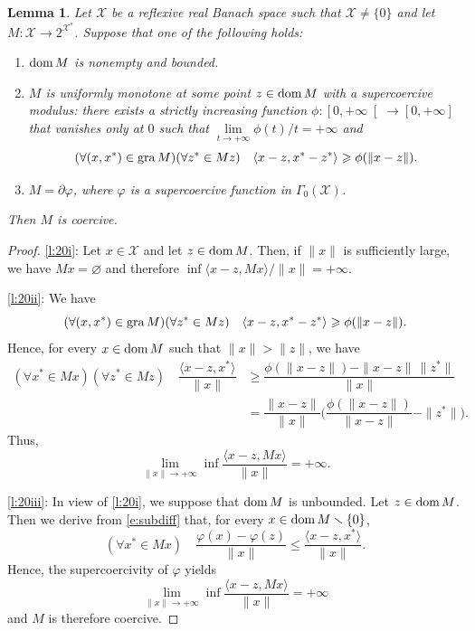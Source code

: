 \documentclass[a4paper,11pt,fleqn]{article}
\renewcommand{\leq}{\ensuremath{\leqslant}}
\renewcommand{\geq}{\ensuremath{\geqslant}}
\newcommand{\pair}[2]{\langle{{#1},{#2}}\rangle}
\newcommand{\XX}{\ensuremath{{\mathcal X}}}
\newcommand{\emp}{\ensuremath{{\varnothing}}}
\newcommand{\pinf}{\ensuremath{{+\infty}}}
\newcommand{\dom}{\ensuremath{\text{\rm dom}\,}}
\newcommand{\gra}{\ensuremath{\text{\rm gra}\,}}
\newtheorem{lemma}[theorem]{Lemma}
\theoremstyle{plain}{\theorembodyfont{\rmfamily}%
\newtheorem{conjecture}[theorem]{Conjecture}}
\theoremstyle{plain}{\theorembodyfont{\rmfamily}%
\newtheorem{example}[theorem]{Example}}
\theoremstyle{plain}{\theorembodyfont{\rmfamily}%
\newtheorem{remark}[theorem]{Remark}}
\theoremstyle{plain}{\theorembodyfont{\rmfamily}%
\newtheorem{algorithm}[theorem]{Algorithm}}
\theoremstyle{plain}{\theorembodyfont{\rmfamily}%
\newtheorem{condition}[theorem]{Condition}}
\theoremstyle{plain}{\theorembodyfont{\rmfamily}%
\newtheorem{definition}[theorem]{Definition}}
\theoremstyle{plain}{\theorembodyfont{\rmfamily}
\newtheorem{problem}[theorem]{Problem}}
\theoremstyle{plain}{\theorembodyfont{\rmfamily}
\newtheorem{notation}[theorem]{Notation}}
\numberwithin{equation}{section}
\begin{document}
\begin{lemma}
\label{l:20}
Let $\XX$ be a reflexive real Banach space such that 
$\XX\neq\{0\}$ and let $M\colon\XX\to 2^{\XX^*}$.
Suppose that one of the following holds:
\begin{enumerate}
\item
\label{l:20i}
$\dom M$ is nonempty and bounded.
\item
\label{l:20ii}
$M$ is uniformly monotone at some point $z\in\dom M$ with a
supercoercive modulus: there exists a strictly increasing function 
$\phi\colon\left[0,+\infty\right[\to\left[0,+\infty\right]$ that 
vanishes only at $0$ such that 
$\lim\limits_{t\to+\infty}\phi(t)/t=+\infty$ and
\begin{equation}
(\forall (x,x^*)\in\gra M)(\forall z^*\in Mz)\quad 
\pair{x-z}{x^*-z^*}\geq\phi(\|x-z\|).
\end{equation}
\item
\label{l:20iii}
$M=\partial\varphi$, where $\varphi$ is a supercoercive function 
in $\Gamma_0(\XX)$.
\end{enumerate}
Then $M$ is coercive. 
\end{lemma}
\begin{proof}
\ref{l:20i}:
Let $x\in\XX$ and let $z\in\dom M$. Then, if $\|x\|$ is
sufficiently large, we have $Mx=\emp$ and therefore 
$\inf{\pair{x-z}{Mx}}/{\|x\|}=\pinf$.

\ref{l:20ii}: We have
\begin{equation}
(\forall (x,x^*)\in\gra M)(\forall z^*\in Mz)\quad 
\pair{x-z}{x^*-z^*}\geq\phi(\|x-z\|).
\end{equation}
Hence, for every $x\in\dom M$ such that $\|x\|>\|z\|$, we have
\begin{align}
(\forall x^*\in Mx)(\forall z^*\in Mz)\quad
\dfrac{\pair{x-z}{x^*}}{\|x\|}
&\geq\dfrac{\phi(\|x-z\|)-\|x-z\|\,\|z^*\|}{\|x\|}\nonumber\\
&=\dfrac{\|x-z\|}{\|x\|}\bigg(
\dfrac{\phi(\|x-z\|)}{\|x-z\|}-\|z^*\|\bigg).
\end{align}
Thus, 
\begin{equation}
\lim_{\|x\|\to+\infty}\inf\dfrac{\pair{x-z}{Mx}}{\|x\|}=\pinf.
\end{equation}

\ref{l:20iii}: In view of \ref{l:20i}, we suppose that
$\dom M$ is unbounded. Let $z\in\dom M$. Then we derive from 
\eqref{e:subdiff} that, for every 
$x\in\dom M\smallsetminus\{0\}$,
\begin{equation}
\label{eQA8h34-05}
(\forall x^*\in Mx)\quad\dfrac{\varphi(x)-\varphi(z)}{\|x\|}\leq
\dfrac{\pair{x-z}{x^*}}{\|x\|}.
\end{equation}
Hence, the supercoercivity of $\varphi$ yields
\begin{equation}
\label{eQA8h34-06}
\lim_{\|x\|\to+\infty}\inf\dfrac{\pair{x-z}{Mx}}{\|x\|}=\pinf
\end{equation}
and $M$ is therefore coercive.
\end{proof}
\end{document}
